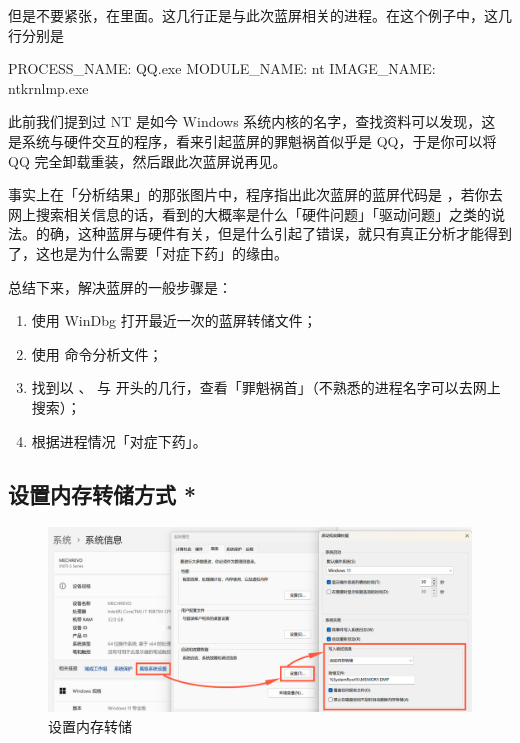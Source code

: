 但是不要紧张，在里面\cprotect{}。这几行正是与此次蓝屏相关的进程。在这个例子中，这几行分别是

\begin{MissingVerbatim}
PROCESS_NAME:  QQ.exe
MODULE_NAME: nt
IMAGE_NAME:  ntkrnlmp.exe
\end{MissingVerbatim}

此前我们提到过 NT 是如今 Windows 系统内核的名字，查找资料可以发现，这  是系统与硬件交互的程序，看来引起蓝屏的罪魁祸首似乎是 QQ，于是你可以将 QQ 完全卸载重装，然后跟此次蓝屏说再见。

事实上在「分析结果」的那张图片中，程序指出此次蓝屏的蓝屏代码是 ，若你去网上搜索相关信息的话，看到的大概率是什么「硬件问题」「驱动问题」之类的说法。的确，这种蓝屏与硬件有关，但是什么引起了错误，就只有真正分析才能得到了，这也是为什么需要「对症下药」的缘由。

总结下来，解决蓝屏的一般步骤是：

\begin{enumerate}
  \item 使用 WinDbg 打开最近一次的蓝屏转储文件；
  \item 使用  命令分析文件；
  \item 找到以 、 与  开头的几行，查看「罪魁祸首」（不熟悉的进程名字可以去网上搜索）；
  \item 根据进程情况「对症下药」。
\end{enumerate}

\subsection{设置内存转储方式 *}

\begin{figure}[htb!]
  \centering
  \includegraphics[width=.8\textwidth]{assets/advanced/Dump_Settings.png}
  \caption{设置内存转储}
  \label{fig:Dump_Settings}
\end{figure}

